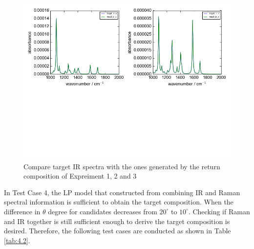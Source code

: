 \begin{figure}[!ht]
\centering
\includegraphics[scale=0.7]{Figures/ir_xz_result_plotting.png}
\caption{Compare target IR spectra with the ones generated by the return composition of Expreiment 1, 2 and 3}  \label{fig:4.1}
\end{figure}

In Test Case 4, the LP model that constructed from combining IR and Raman spectral information is sufficient to obtain the target composition. When the difference in $\theta$ degree for candidates decreases from $20^{\circ}$ to $10^{\circ}$. Checking if Raman and IR together is still sufficient enough to derive the target composition is desired. Therefore, the following test cases are conducted as shown in Table \ref{tab:4.2}. \\

